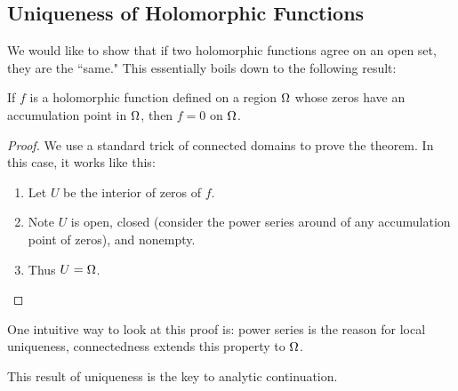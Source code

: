 \subsection{Uniqueness of Holomorphic Functions}
We would like to show that if two holomorphic functions agree on an open set, they are the ``same." This essentially boils down to the following result:
\begin{thm}
    If $f$ is a holomorphic function defined on a region $\Omega$ whose zeros have an accumulation point in $\Omega$, then $f = 0$ on $\Omega$.
\end{thm}
\begin{proof}
    We use a standard trick of connected domains to prove the theorem. In this case, it works like this:
    \begin{enumerate}
        \item Let $U$ be the interior of zeros of $f$.
        \item Note $U$ is open, closed (consider the power series around of any accumulation point of zeros), and nonempty.
        \item Thus $U = \Omega$.
    \end{enumerate}
\end{proof}
One intuitive way to look at this proof is: power series is the reason for local uniqueness, connectedness extends this property to $\Omega$.

This result of uniqueness is the key to analytic continuation.
